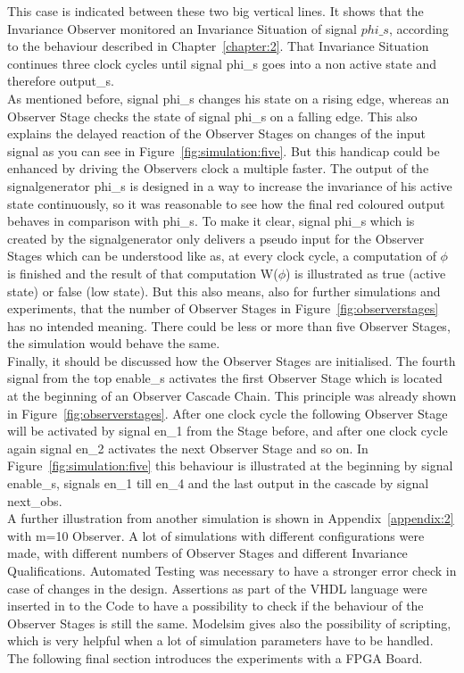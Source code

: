 This case is indicated between these two big vertical lines. 
It shows that the Invariance Observer monitored an Invariance Situation of signal $phi\_s$, according to the behaviour described in Chapter~\ref{chapter:2}. 
That Invariance Situation continues three clock cycles until signal phi\_s goes into a non active state and therefore output\_s. \\
As mentioned before, signal phi\_s changes his state on a rising edge, whereas an Observer Stage checks the state of signal phi\_s on a falling edge. 
This also explains the delayed reaction of the Observer Stages on changes of the input signal as you can see in Figure~\ref{fig:simulation:five}. 
But this handicap could be enhanced by driving the Observers clock a multiple faster. 
The output of the signalgenerator phi\_s is designed in a way to increase the invariance of his active state continuously, so it was reasonable to see how the final red coloured output behaves in comparison with phi\_s. 
To make it clear, signal phi\_s which is created by the signalgenerator only delivers a pseudo input for the Observer Stages which can be understood like as, at every clock cycle, a computation of 
$\phi$ is finished and the result of that computation W($\phi$) is illustrated as true (active state) or false (low state). 
But this also means, also for further simulations and experiments, that the number of Observer Stages in Figure~\ref{fig:observerstages} has no intended meaning. 
There could be less or more than five Observer Stages, the simulation would behave the same. \\  
Finally, it should be discussed how the Observer Stages are initialised. 
The fourth signal from the top enable\_s activates the first Observer Stage which is located at the beginning of an Observer Cascade Chain. 
This principle was already shown in Figure~\ref{fig:observerstages}. 
After one clock cycle the following Observer Stage will be activated by signal en\_1 from the Stage before, and after one clock cycle again signal en\_2 activates the next Observer Stage and so on. 
In Figure~\ref{fig:simulation:five} this behaviour is illustrated at the beginning by signal enable\_s, signals en\_1 till en\_4 and the last output in the cascade by signal next\_obs. \\
A further illustration from another simulation is shown in Appendix~\ref{appendix:2} with m=10 Observer. 
A lot of simulations with different configurations were made, with different numbers of Observer Stages and different Invariance Qualifications. 
Automated Testing was necessary to have a stronger error check in case of changes in the design. 
Assertions as part of the VHDL language were inserted in to the Code to have a possibility to check if the behaviour of the Observer Stages is still the same. 
Modelsim gives also the possibility of scripting, which is very helpful when a lot of simulation parameters have to be handled. \\
The following final section introduces the experiments with a FPGA Board. 


